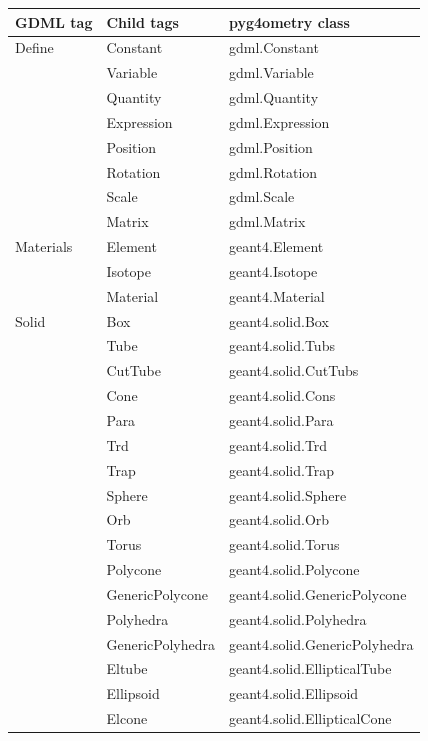 \documentclass[final,5p,times,twocolumn]{elsarticle}
\begin{document}
\begin{table}[hbt!]
\centering
\begin{tabular}{ l l l } \hline
GDML tag 		& Child tags				& pyg4ometry class 				\\ \hline
Define 			& Constant				& gdml.Constant				\\
				& Variable					& gdml.Variable					\\
				& Quantity					& gdml.Quantity				\\
				& Expression 				& gdml.Expression				\\
				& Position					& gdml.Position					\\
				& Rotation					& gdml.Rotation				\\
				& Scale					& gdml.Scale					\\
				& Matrix					& gdml.Matrix					\\ \hline
Materials 			& Element					& geant4.Element				\\
				& Isotope					& geant4.Isotope				\\
				& Material					& geant4.Material				\\ \hline
Solid  			& Box					& geant4.solid.Box				\\
	  			& Tube					& geant4.solid.Tubs				\\
	  			& CutTube				& geant4.solid.CutTubs			\\
	  			& Cone					& geant4.solid.Cons				\\
	  			& Para					& geant4.solid.Para				\\
	  			& Trd					& geant4.solid.Trd				\\
	  			& Trap					& geant4.solid.Trap				\\
	  			& Sphere					& geant4.solid.Sphere			\\
	  			& Orb					& geant4.solid.Orb				\\
	  			& Torus					& geant4.solid.Torus				\\
	  			& Polycone				& geant4.solid.Polycone			\\
	  			& GenericPolycone			& geant4.solid.GenericPolycone	\\
	  			& Polyhedra				& geant4.solid.Polyhedra			\\
				& GenericPolyhedra                  & geant4.solid.GenericPolyhedra	\\ 
	  			& Eltube					& geant4.solid.EllipticalTube		\\
	  			& Ellipsoid					& geant4.solid.Ellipsoid			\\
	  			& Elcone					& geant4.solid.EllipticalCone		\\

\end{tabular}
\end{table}
\end{document}
